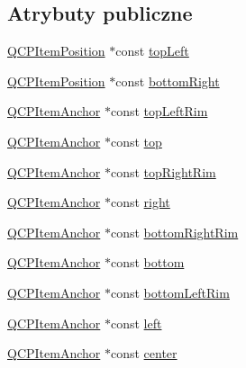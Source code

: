 \subsection*{Atrybuty publiczne}
\begin{DoxyCompactItemize}
\item 
\hyperlink{class_q_c_p_item_position}{Q\+C\+P\+Item\+Position} $\ast$const \hyperlink{class_q_c_p_item_ellipse_a12fd8420c06718d0c8a2303d6a652848}{top\+Left}
\item 
\hyperlink{class_q_c_p_item_position}{Q\+C\+P\+Item\+Position} $\ast$const \hyperlink{class_q_c_p_item_ellipse_ab73c8deafc0d8d1ef7d75b6cdcc37159}{bottom\+Right}
\item 
\hyperlink{class_q_c_p_item_anchor}{Q\+C\+P\+Item\+Anchor} $\ast$const \hyperlink{class_q_c_p_item_ellipse_a33ebd2a751b63b9240edc9aa46c19eff}{top\+Left\+Rim}
\item 
\hyperlink{class_q_c_p_item_anchor}{Q\+C\+P\+Item\+Anchor} $\ast$const \hyperlink{class_q_c_p_item_ellipse_ad50f907d6f9d1402c6c5d302dca5c5d5}{top}
\item 
\hyperlink{class_q_c_p_item_anchor}{Q\+C\+P\+Item\+Anchor} $\ast$const \hyperlink{class_q_c_p_item_ellipse_a744446970b38a4a3bbea46d722b7c54d}{top\+Right\+Rim}
\item 
\hyperlink{class_q_c_p_item_anchor}{Q\+C\+P\+Item\+Anchor} $\ast$const \hyperlink{class_q_c_p_item_ellipse_a50091a3bd8761d3ce0d95d9c727e4a82}{right}
\item 
\hyperlink{class_q_c_p_item_anchor}{Q\+C\+P\+Item\+Anchor} $\ast$const \hyperlink{class_q_c_p_item_ellipse_a5c8404be601d61b7fafeaaf1c05c4c42}{bottom\+Right\+Rim}
\item 
\hyperlink{class_q_c_p_item_anchor}{Q\+C\+P\+Item\+Anchor} $\ast$const \hyperlink{class_q_c_p_item_ellipse_a2dc80ff9f5db600eae0133bdde65066f}{bottom}
\item 
\hyperlink{class_q_c_p_item_anchor}{Q\+C\+P\+Item\+Anchor} $\ast$const \hyperlink{class_q_c_p_item_ellipse_a31f31a9e9f9098c90fb47573094276c5}{bottom\+Left\+Rim}
\item 
\hyperlink{class_q_c_p_item_anchor}{Q\+C\+P\+Item\+Anchor} $\ast$const \hyperlink{class_q_c_p_item_ellipse_aa259cd03efaedf60cf5b1019b20e4f2b}{left}
\item 
\hyperlink{class_q_c_p_item_anchor}{Q\+C\+P\+Item\+Anchor} $\ast$const \hyperlink{class_q_c_p_item_ellipse_a8b6dd0e854f99239c5806ffdf2f590b3}{center}
\end{DoxyCompactItemize}
